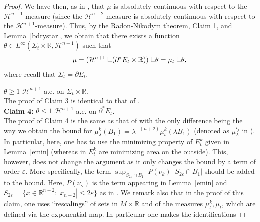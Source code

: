 \documentclass[11pt]{amsart}
\renewcommand{\epsilon}{\varepsilon}
\def\R{\mathbb{R}}
\def\e{\epsilon}
\def\r{\rho}
\def\l{\lambda}
\def\k{\kappa}
\def\H{\mathcal{H}}
\def\ov{\overline}
\def\res{\hbox{ {\vrule height .25cm}{\leaders\hrule\hskip.2cm}}\hskip5.0\mu}
\begin{document}
\begin{proof}
We have then, as in  \cite[Claim 2 of proof of Proposition 5.10]{S08}, that $\mu$ is absolutely continuous with respect to  the $\H^{n+1}$-measure (since the $\H^{n+2}$-measure  is absolutely continuous with respect to  the $\H^{n+1}$-measure). Thus, by the Radon-Nikodym theorem, Claim 1, and Lemma~\ref{bdrystar}, we obtain that  there exists a function $\theta\in L^\infty(\Sigma_t\times\R, \H^{n+1})$ such that
\begin{equation}\label{mumut}
\mu=(\H^{n+1}\res(\partial^*E_t\times\R))\res\theta=\mu_t\res\theta,
\end{equation}
where recall that $\Sigma_t=\partial E_t$.

 $\theta\ge 1$ $\H^{n+1}$-a.e. on $\Sigma_t\times\R$.\\
The proof of Claim 3 is identical to that of \cite[Claim 3 of proof of Proposition 5.10]{S08}.\\
%
{\bf Claim 4:} $\theta\le 1$ $\H^{n+1}$-a.e. on $\partial^*E_t$.\\
The proof of Claim 4 is the same as that of \cite[Claim 4 of proof of Proposition 5.10]{S08} with the only difference being the way we obtain the  bound for $\mu_\l^{k}(B_1)= \l^{-(n+2)}\mu_t^{k}(\l B_1)$ (denoted as $\mu_\l^{i_j}$ in \cite[line 20, page 221]{S08}). In particular, here, one has to use the  minimizing  property of $E_t^k$ given in Lemma~\ref{emin} (whereas in \cite{S08} $E_t^k$ are minimizing area on the outside). This, however, does not change the argument as it only changes the bound by a term of order $\e$. More specifically, the term $\sup_{S_{2\e}\cap B_1}|P(\nu_k)||S_{2\e}\cap B_1|$ should be added to the bound. Here, $P(\nu_\k)$ is the term appearing in Lemma~\ref{emin} and $S_{2\e}=\{x\in \R^{n+2}:|x_{n+2}|\le 2\e\}$ as in \cite{S08}. We remark also that in the proof of this claim, one uses ``rescalings'' of sets in $M\times\R$ and of the measures $\mu_t^k, \mu_t$, which are defined via the exponential map. In particular one makes the identifications

\end{proof}
\end{document}
